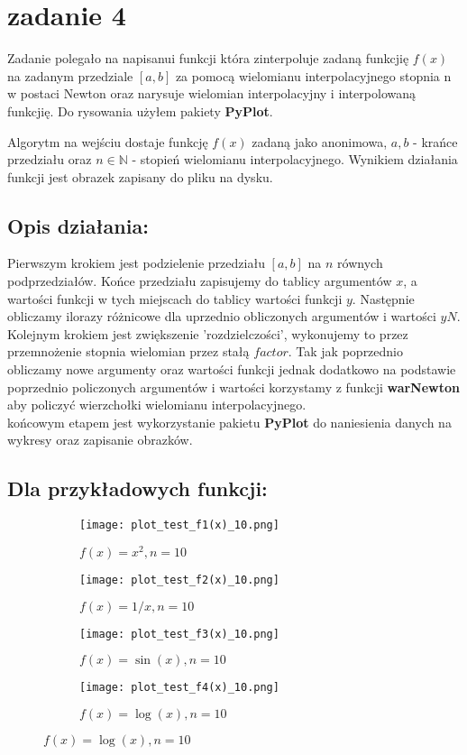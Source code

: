 \section{zadanie 4}
Zadanie polegało na napisanui funkcji która zinterpoluje zadaną funkcjię \(f(x)\) na zadanym przedziale \([a, b]\) za pomocą wielomianu interpolacyjnego stopnia n w postaci Newton oraz narysuje wielomian interpolacyjny i interpolowaną funkcjię. Do rysowania użyłem pakiety \textbf{PyPlot}.

Algorytm na wejściu dostaje funkcję \(f(x)\) zadaną jako anonimowa, \(a, b\) - krańce przedziału oraz \(n \in \mathbb{N} \) - stopień wielomianu interpolacyjnego.
Wynikiem działania funkcji jest obrazek zapisany do pliku na dysku.

\subsection{Opis działania: }
Pierwszym krokiem jest podzielenie przedziału \([a, b]\) na \(n\) równych podprzedziałów. Końce przedziału zapisujemy do tablicy argumentów \(x\), a wartości funkcji w tych miejscach do tablicy wartości funkcji \(y\). Następnie obliczamy ilorazy różnicowe dla 
uprzednio obliczonych argumentów i wartości \(yN\).\\
Kolejnym krokiem jest zwiększenie 'rozdzielczości', wykonujemy to przez przemnożenie stopnia wielomian przez stałą \(factor\). Tak jak poprzednio obliczamy nowe argumenty oraz wartości funkcji jednak dodatkowo na podstawie poprzednio policzonych argumentów i wartości korzystamy z funkcji \textbf{warNewton} aby policzyć wierzchołki wielomianu interpolacyjnego.\\
końcowym etapem jest wykorzystanie pakietu \textbf{PyPlot} do naniesienia danych na wykresy oraz zapisanie obrazków.

\subsection{Dla przykładowych funkcji: }

\begin{figure}[ht]
  \begin{subfigure}{0.5\textwidth}
    \centering
    \texttt{[image: plot\_test\_f1(x)\_10.png]}
    \caption{\(f(x) = x^2, n = 10\)}
  \end{subfigure}
  \begin{subfigure}{0.5\textwidth}
    \centering
    \texttt{[image: plot\_test\_f2(x)\_10.png]}
    \caption{\(f(x) = 1/x, n = 10\)}
  \end{subfigure}

  \begin{subfigure}{0.5\textwidth}
    \centering
    \texttt{[image: plot\_test\_f3(x)\_10.png]}
    \caption{\(f(x) = \sin(x), n = 10\)}
  \end{subfigure}
  \begin{subfigure}{0.5\textwidth}
    \centering
    \texttt{[image: plot\_test\_f4(x)\_10.png]}
    \caption{\(f(x) = \log(x), n = 10\)}
  \end{subfigure}
\end{figure}